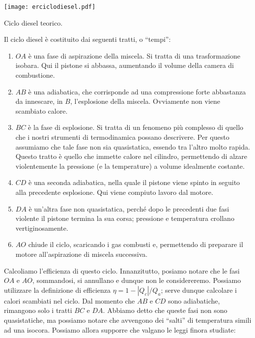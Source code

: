 \begin{marginfigure}
    \centering
    \texttt{[image: erciclodiesel.pdf]}
    \caption{Ciclo diesel teorico.}
    \label{erciclodiesel}
\end{marginfigure}

\noindent Il ciclo diesel è costituito dai seguenti tratti, o
``tempi'':
\begin{enumerate}
    \item $OA$ è una fase di aspirazione della miscela. Si
    tratta di una trasformazione isobara. Qui il pistone si
    abbassa, aumentando il volume della camera di combustione.

    \item $AB$ è una adiabatica, che corrisponde ad una compressione
    forte abbastanza da innescare, in $B$, l'esplosione della
    miscela. Ovviamente non viene scambiato calore.

    \item $BC$ è la fase di esplosione. Si tratta di un fenomeno
    più complesso di quello che i nostri strumenti di termodinamica
    possano descrivere. Per questo assumiamo che tale fase non
    sia quasistatica, essendo tra l'altro molto rapida. Questo tratto
    è quello che immette calore
    nel cilindro, permettendo di alzare violentemente la pressione
    (e la temperature) a volume idealmente costante.

    \item $CD$ è una seconda adiabatica, nella quale il pistone
    viene spinto in seguito alla precedente esplosione. Qui viene
    compiuto lavoro dal motore.

    \item $DA$ è un'altra fase non quasistatica, perché dopo le
    precedenti due fasi violente il pistone termina la sua
    corsa; pressione e temperatura crollano vertiginosamente.

    \item $AO$ chiude il ciclo, scaricando i gas combusti e,
    permettendo di preparare il motore all'aspirazione di miscela
    successiva.
\end{enumerate}

Calcoliamo l'efficienza di questo ciclo. Innanzitutto, posiamo
notare che le fasi $OA$ e $AO$, sommandosi, si annullano e dunque
non le considereremo. Possiamo utilizzare la definizione di
efficienza $\eta = 1 - |Q_c|/Q_a$; serve dunque calcolare i
calori scambiati nel ciclo. Dal momento che $AB$ e $CD$ sono
adiabatiche, rimangono solo i tratti $BC$ e $DA$. Abbiamo detto
che queste fasi non sono quasistatiche, ma possiamo notare che
avvengono dei ``salti'' di temperatura simili ad una isocora.
Possiamo allora supporre che valgano le leggi finora studiate:

